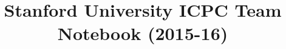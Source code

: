 \documentclass[10pt]{article}
\title{\vspace{-4ex}\Large{Stanford University ICPC Team Notebook (2015-16)}}
\author{}
\date{}
\begin{document}
\begin{landscape}
\begin{multicols}{2}

\maketitle
\vspace{-10ex}
\tableofcontents
\pagestyle{fancy}



\end{multicols}
\end{landscape}
\end{document}
